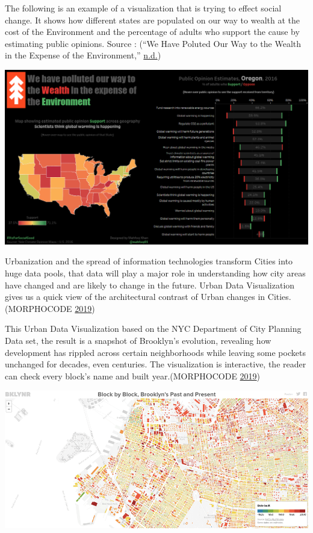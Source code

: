 \documentclass[]{book}
\begin{document}
The following is an example of a visualization that is trying to effect social change. It shows how different states are populated on our way to wealth at the cost of the Environment and the percentage of adults who support the cause by estimating public opinions. Source : (``We Have Poluted Our Way to the Wealth in the Expense of the Environment,'' \protect\hyperlink{ref-Yale_Climate_Opinion}{n.d.})

\includegraphics{images/social_change.PNG}

Urbanization and the spread of information technologies transform Cities into huge data pools, that data will play a major role in understanding how city areas have changed and are likely to change in the future. Urban Data Visualization gives us a quick view of the architectural contrast of Urban changes in Cities. (MORPHOCODE \protect\hyperlink{ref-MORPHOCODE}{2019})

This Urban Data Visualization based on the NYC Department of City Planning Data set, the result is a snapshot of Brooklyn's evolution, revealing how development has rippled across certain neighborhoods while leaving some pockets unchanged for decades, even centuries. The visualization is interactive, the reader can check every block's name and built year.(MORPHOCODE \protect\hyperlink{ref-MORPHOCODE}{2019})

\includegraphics{images/urbanviz.png}
\end{document}
